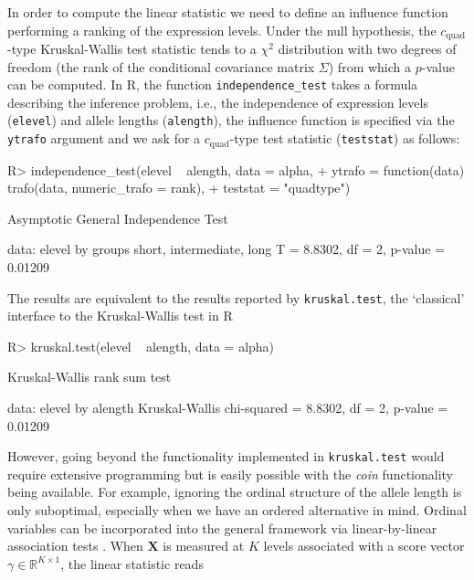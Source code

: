 \documentclass{article}
\newcommand{\Rpackage}[1]{\textit{#1}}
\newcommand{\Robject}[1]{\texttt{#1}}
\newcommand{\Rcmd}[1]{\texttt{#1}}
\newcommand{\RR}{\textsf{R}}
\newcommand{\R}{\mathbb{R} }
\newcommand{\X}{\mathbf{X}}
\newenvironment{Schunk}{}{}
\begin{document}
In order to compute the linear statistic we need to define an
influence function performing a ranking of the expression levels.
Under the null hypothesis, the $c_\text{quad}$-type Kruskal-Wallis 
test statistic tends to a $\chi^2$
distribution with two degrees of freedom (the rank of the conditional
covariance matrix $\Sigma$) from which a $p$-value can be
computed. In \RR{}, the function \Rcmd{independence\_test} takes a formula
describing the inference problem, i.e., the independence of expression
levels (\Robject{elevel}) and allele lengths (\Robject{alength}), the
influence function is specified via the \Rcmd{ytrafo} argument and we ask
for a $c_\text{quad}$-type test statistic (\Rcmd{teststat}) as follows:
\begin{Schunk}
\begin{Sinput}
R> independence_test(elevel ~ alength, data = alpha, 
+     ytrafo = function(data) trafo(data, numeric_trafo = rank), 
+     teststat = "quadtype")
\end{Sinput}
\begin{Soutput}
	Asymptotic General Independence Test

data:  elevel by groups short, intermediate, long 
T = 8.8302, df = 2, p-value = 0.01209
\end{Soutput}
\end{Schunk}
The results are equivalent to the results reported by \Rcmd{kruskal.test},
the `classical' interface to the Kruskal-Wallis test in \RR{}
\begin{Schunk}
\begin{Sinput}
R> kruskal.test(elevel ~ alength, data = alpha)
\end{Sinput}
\begin{Soutput}
	Kruskal-Wallis rank sum test

data:  elevel by alength 
Kruskal-Wallis chi-squared = 8.8302, df = 2, p-value =
0.01209
\end{Soutput}
\end{Schunk}
However, going beyond the functionality implemented in \Rcmd{kruskal.test}
would require extensive programming but is easily possible with the
\Rpackage{coin} functionality being available. For example, 
ignoring the ordinal structure of the allele length is only
suboptimal, especially when we have an ordered alternative in mind. 
Ordinal variables can be incorporated into the general framework
via linear-by-linear association tests \citep{Agresti2002}. 
When $\X$ is measured at $K$ levels associated with a score vector 
$\gamma \in \R^{K \times 1}$, the linear statistic reads
\end{document}

